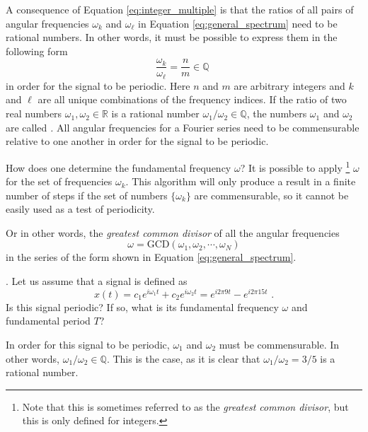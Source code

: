 A consequence of Equation \ref{eq:integer_multiple} is that the ratios of all pairs of angular frequencies $\omega_k$ and $\omega_{\ell}$ in Equation \ref{eq:general_spectrum} need to be rational numbers. In other words, it must be possible to express them in the following form
\begin{equation}
\frac{\omega_k}{\omega_{\ell}} = \frac{n}{m} \in \mathbb{Q} \,\,
\end{equation}
in order for the signal to be periodic. Here $n$ and $m$ are arbitrary integers and $k$ and $\ell$ are all unique combinations of the frequency indices. If the ratio of two real numbers $\omega_1,\omega_2\in\mathbb{R}$ is a rational number $\omega_1/\omega_2 \in \mathbb{Q}$, the numbers $\omega_1$ and $\omega_2$ are called \emph{.} All angular frequencies for a Fourier series need to be commensurable relative to one another in order for the signal to be periodic.

How does one determine the fundamental frequency $\omega$? It is possible to apply \emph{}\footnote{Note that this is sometimes referred to as the \emph{greatest common divisor}, but this is only defined for
integers.} $\omega$ for the set of frequencies $\omega_k$. This algorithm will only produce a result in a finite number of steps if the set of numbers $\{\omega_k\}$ are commensurable, so it cannot be easily used as a test of periodicity.

Or in other words, the \emph{greatest common divisor} of all the angular frequencies
\begin{equation}
\boxed{
\omega = \mathrm{GCD}(\omega_1,\omega_2,\cdots,\omega_N)
}
\end{equation}
in the series of the form shown in Equation \ref{eq:general_spectrum}.
\fi

. Let us assume that a signal is defined as 
\begin{equation}
x(t) = c_1 e^{i \omega_1 t} + c_2 e^{i \omega_2 t} = e^{i 2\pi 9t}
- e^{i 2\pi 15t} \,\,.
\end{equation}
Is this signal periodic? If so, what is its fundamental frequency $\omega$ and fundamental period $T$?

In order for this signal to be periodic, $\omega_1$ and $\omega_2$ must be commensurable. In other words, $\omega_1/\omega_2 \in \mathbb{Q}$. This is the case, as it is clear that $\omega_1/\omega_2 = 3/5$ is a rational number.

